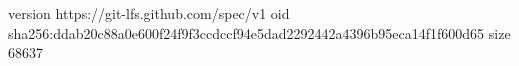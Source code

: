 version https://git-lfs.github.com/spec/v1
oid sha256:ddab20c88a0e600f24f9f3ccdccf94e5dad2292442a4396b95eca14f1f600d65
size 68637
